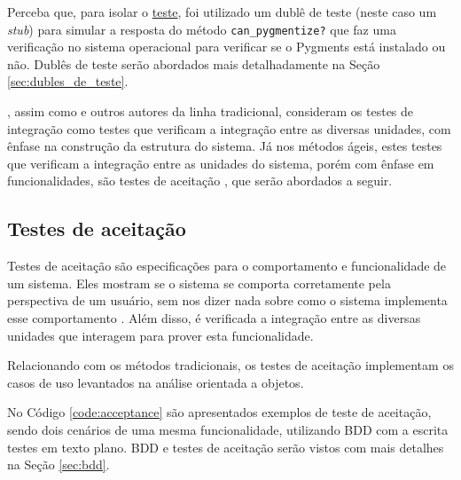 Perceba que, para isolar o \hyperref[code:integration_spec]{teste}, foi utilizado um dublê de teste (neste caso um \textit{stub}) para simular a resposta do método \texttt{can\_pygmentize?} que faz uma verificação no sistema operacional para verificar se o Pygments está instalado ou não. Dublês de teste serão abordados mais detalhadamente na Seção \ref{sec:dubles_de_teste}.

, assim como  e outros autores da linha tradicional, consideram os testes de integração como testes que verificam a integração entre as diversas unidades, com ênfase na construção da estrutura do sistema. Já nos métodos ágeis, estes testes que verificam a integração entre as unidades do sistema, porém com ênfase em funcionalidades, são testes de aceitação \cite{XPTeles}, que serão abordados a seguir.


\subsection{Testes de aceitação}
\label{ssub:testes_de_aceitacao}

Testes de aceitação são especificações para o comportamento e funcionalidade de um sistema. Eles mostram se o sistema se comporta corretamente pela perspectiva de um usuário, sem nos dizer nada sobre como o sistema implementa esse comportamento \cite{TestDrivenKoskela}. Além disso, é verificada a integração entre as diversas unidades que interagem para prover esta funcionalidade.

Relacionando com os métodos tradicionais, os testes de aceitação implementam os casos de uso levantados na análise orientada a objetos.

No Código \ref{code:acceptance} são apresentados exemplos de teste de aceitação, sendo dois cenários de uma mesma funcionalidade, utilizando BDD com a escrita testes em texto plano. BDD e testes de aceitação serão vistos com mais detalhes na Seção \ref{sec:bdd}.


